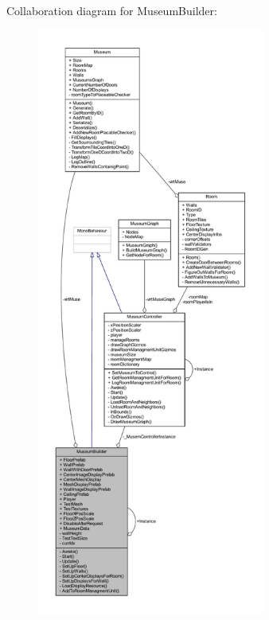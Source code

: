 Collaboration diagram for Museum\+Builder\+:
\nopagebreak
\begin{figure}[H]
\begin{center}
\leavevmode
\includegraphics[height=550pt]{class_museum_builder__coll__graph}
\end{center}
\end{figure}
